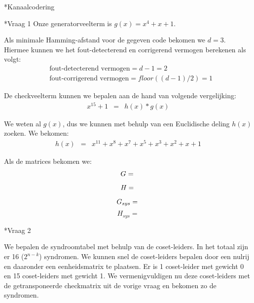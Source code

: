 \documentclass[]{article}
\begin{document}
\begin{section}*{Kanaalcodering}

    \begin{subsection}*{Vraag 1}
        Onze generatorveelterm is $g(x) = x^4 + x + 1$.

        Als minimale Hamming-afstand voor de gegeven code bekomen we
        $d=3$. Hiermee kunnen we het fout-detecterend en corrigerend
        vermogen berekenen als volgt:
        \begin{eqnarray*}
            & \text{fout-detecterend vermogen} = d-1 = 2 \\
            & \text{fout-corrigerend vermogen} = floor((d-1)/2) = 1
        \end{eqnarray*}

        De checkveelterm kunnen we bepalen aan de hand van volgende
        vergelijking:
        \begin{eqnarray*}
            x^{15} + 1 &=& h(x) * g(x)
        \end{eqnarray*}

        We weten al $g(x)$, dus we kunnen met behulp van een
        Euclidische deling $h(x)$ zoeken. We bekomen:
        \begin{eqnarray*}
            h(x) &=& x^{11} + x^8 + x^7 + x^5 + x^3 + x^2 + x + 1
        \end{eqnarray*}

        Als de matrices bekomen we:
        \[
            G =\\
        \]\[
            H =\\
        \]\[
            G_{sys} =\\
        \]\[
            H_{sys} =
        \]

    \end{subsection}

    \begin{subsection}*{Vraag 2} %

        We bepalen de syndroomtabel met behulp van de coset-leiders.
        In het totaal zijn er 16 ($2^{n-k}$) syndromen. We kunnen snel
        de coset-leiders bepalen door een nulrij en daaronder een
        eenheidsmatrix te plaatsen. Er is 1 coset-leider met gewicht
        0 en 15 coset-leiders met gewicht 1. We vermenigvuldigen nu
        deze coset-leiders met de getransponeerde checkmatrix uit de
        vorige vraag en bekomen zo de syndromen.


\end{subsection}
\end{section}
\end{document}
